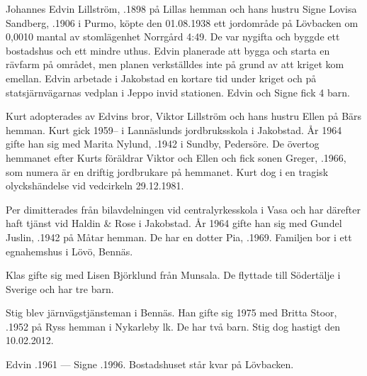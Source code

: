 Johannes Edvin Lillström, .1898 på Lillas hemman och hans hustru Signe Lovisa Sandberg, .1906 i Purmo, köpte den 01.08.1938 ett jordområde på Lövbacken om 0,0010 mantal av stomlägenhet Norrgård 4:49. De var nygifta och byggde ett bostadshus och ett mindre uthus. Edvin planerade att bygga och starta en rävfarm på området, men planen verkställdes inte på grund av att kriget kom emellan. Edvin arbetade i Jakobstad en kortare tid under kriget och på statsjärnvägarnas vedplan i Jeppo invid stationen. Edvin och Signe fick 4 barn.
\begin{jhchildren}
  \item {}
  \item {}
  \item {}
  \item {}
\end{jhchildren}

Kurt adopterades av Edvins bror, Viktor Lillström och hans hustru Ellen på Bärs hemman. Kurt gick 1959--	i Lannäslunds jordbruksskola i Jakobstad. År 1964 gifte han sig med Marita Nylund, .1942 i Sundby,	Pedersöre. De övertog hemmanet efter Kurts föräldrar Viktor och Ellen och fick sonen Greger, .1966, som numera är en driftig jordbrukare på hemmanet. Kurt dog i en tragisk olyckshändelse vid vedcirkeln 29.12.1981.

Per dimitterades från bilavdelningen vid centralyrkesskola i Vasa och har därefter haft tjänst vid Haldin \& Rose i Jakobstad. År 1964 gifte han sig med Gundel Juslin, .1942 på Måtar hemman. De har en dotter Pia, .1969. Familjen bor i ett egnahemshus i Lövö, Bennäs.

Klas gifte sig med Lisen Björklund från Munsala. De flyttade till Södertälje i Sverige och har tre barn.

Stig blev järnvägstjänsteman i Bennäs. Han gifte sig 1975 med Britta Stoor, .1952 på Ryss hemman i Nykarleby lk. De har två barn. Stig dog hastigt den 10.02.2012.

Edvin .1961  ---  Signe .1996. Bostadshuset står kvar på Lövbacken.



